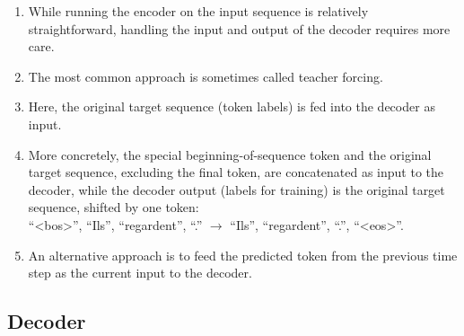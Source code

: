 \begin{enumerate}
    \item While running the encoder on the input sequence is relatively straightforward, handling the input and output of the decoder requires more care. 
    
    \item The most common approach is sometimes called teacher forcing. 
    
    \item Here, the original target sequence (token labels) is fed into the decoder as input. 
    
    \item More concretely, the special beginning-of-sequence token and the original target sequence, excluding the final token, are concatenated as input to the decoder, while the decoder output (labels for training) is the original target sequence, shifted by one token:\\
    “<bos>”, “Ils”, “regardent”, “.” $\rightarrow$ “Ils”, “regardent”, “.”, “<eos>”.

    \item An alternative approach is to feed the predicted token from the previous time step as the current input to the decoder.

\end{enumerate}





\subsection{Decoder \cite{dnn-1}} \label{rnn: Decoder}

